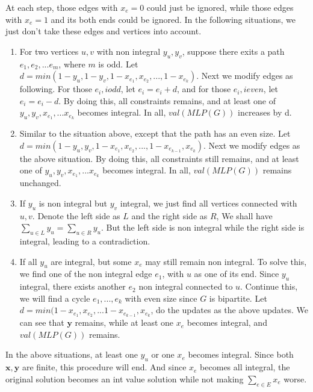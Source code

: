 \documentclass[UTF8]{ctexart}
\begin{document}
    At each step, those edges with $x_e= 0$ could just be ignored, while those edges with $x_e = 1$ and its both ends
    could be ignored. In the following situations, we just don't take these edges and vertices into account.
    \begin{enumerate}
        \item 
            For two vertices $u, v$ with non integral $y_u, y_v$, suppose there exits a path $e_1, e_2, ... e_m$, where $m$ is
            odd. Let $d = min(1 - y_u, 1-y_v, 1-x_{e_1}, x_{e_2}, ..., 1- x_{e_k})$. Next we modify edges as following.
            For those $e_i, i odd$, let $e_i = e_i + d$, and for those $e_i, i even$, let $e_i = e_i - d$. By doing this,
            all constraints remains, and at least one of $y_u, y_v, x_{e_1}, ... x_{e_k}$ becomes integral. In all, $val(MLP(G))$ increases by d. 
        \item
            Similar to the situation above, except that the path has an even size.
            Let $d = min(1 - y_u, y_v, 1-x_{e_1}, x_{e_2}, ..., 1- x_{e_{k - 1}}, x_{e_k})$. Next we modify edges as the above situation.
            By doing this, all constraints still remains, 
            and at least one of $y_u, y_v, x_{e_1}, ... x_{e_k}$ becomes integral. In all, $val(MLP(G))$ remains unchanged.
        \item 
            If $y_u$ is non integral but $y_v$ integral, we just find all vertices connected with $u, v$. Denote the left side as $L$
            and the right side as $R$, We shall have $\sum_{u \in L} y_u = \sum_{u \in R} y_u$. But the left side is non integral while 
            the right side is integral, leading to a contradiction.
        \item 
            If all $y_u$ are integral, but some $x_e$ may still remain non integral. To solve this,
            we find one of the non integral edge $e_1$, with $u$ as one of its end. Since $y_u$ integral, there exists another $e_2$
            non integral connected to $u$. Continue this, we will find a cycle $e_1,...,e_k$ with even size since $G$ is bipartite.
            Let $d = min(1-x_{e_1}, x_{e_2}, ... 1-x_{e_{k - 1}}, x_{e_k}$, do the updates as the above updates.
            We can see that $\mathbf{y}$ remains, while at least one $x_e$ becomes integral, and $val(MLP(G))$ remains.
    \end{enumerate}

    In the above situations, at least one $y_u$ or one $x_e$ becomes integral. Since both $\mathbf{x}, \mathbf{y}$ are finite, 
    this procedure will end. And since $x_e$ becomes all integral, the original solution becomes an int value solution while not making 
    $\sum_{e \in E}x_e$ worse.
\end{document}
